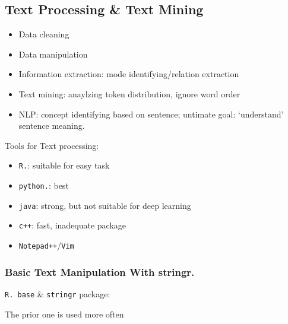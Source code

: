 \subsection{Text Processing \& Text Mining}
    \begin{itemize}[topsep=2pt,itemsep=0pt]
        \item Data cleaning
        \item Data manipulation
        \item Information extraction: mode identifying/relation extraction
        \item Text mining: anaylzing token distribution, ignore word order
        \item NLP: concept identifying based on sentence; untimate goal: `understand' sentence meaning.
    \end{itemize}
    
    Tools for Text processing:
\begin{itemize}[topsep=2pt,itemsep=0pt]
    \item \lstinline|R.|: suitable for easy task 
    \item \lstinline|python.|: best
    \item \lstinline|java|: strong, but not suitable for deep learning
    \item \lstinline|c++|: fast, inadequate package
    \item \lstinline|Notepad++|/\lstinline|Vim|
\end{itemize}

    
        



\subsubsection{Basic Text Manipulation With stringr.}
\begin{point}
    \lstinline|R. base| \& \lstinline|stringr| package:
\end{point}

    The prior one is used more often


